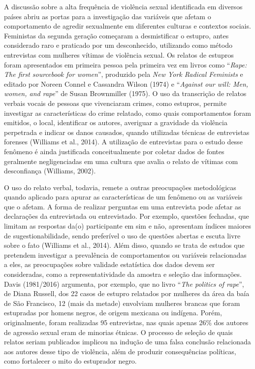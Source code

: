 A discussão sobre a alta frequência de violência sexual identificada em diversos países abriu as portas para a investigação das variáveis que afetam o comportamento de agredir sexualmente em diferentes culturas e contextos sociais. Feministas da segunda geração começaram a desmistificar o estupro, antes considerado raro e praticado por um desconhecido, utilizando como método entrevistas com mulheres vítimas de violência sexual. Os relatos de estupros foram apresentados em primeira pessoa pela primeira vez em livros como ``\textit{Rape: The first sourcebook for women}'', produzido pela \textit{New York Radical Feminists} e editado por Noreen Connel e Cassandra Wilson (1974) e ``\textit{Against our will: Men, women, and rape}'' de Susan Brownmiller (1975). O uso da transcrição de relatos verbais vocais de pessoas que vivenciaram crimes, como estupros, permite investigar as características do crime relatado, como quais comportamentos foram emitidos, o local, identificar os autores, averiguar a gravidade da violência perpetrada e indicar os danos causados, quando utilizadas técnicas de entrevistas forenses (Williams et al., 2014). A utilização de entrevistas para o estudo desse fenômeno é ainda justificada conceitualmente por coletar dados de fontes geralmente negligenciadas em uma cultura que avalia o relato de vítimas com desconfiança (Williams, 2002). 

O uso do relato verbal, todavia, remete a outras preocupações metodológicas quando aplicado para apurar as características de um fenômeno ou as variáveis que o afetam. A forma de realizar perguntas em uma entrevista pode afetar as declarações da entrevistada ou entrevistado. Por exemplo, questões fechadas, que limitam as respostas da(o) participante em sim e não, apresentam índices maiores de sugestionabilidade, sendo preferível o uso de questões abertas e escuta livre sobre o fato (Williams et al., 2014). Além disso, quando se trata de estudos que pretendem investigar a prevalência de comportamentos ou variáveis relacionadas a eles, as preocupações sobre validade estatística dos dados devem ser consideradas, como a representatividade da amostra e seleção das informações. Davis (1981/2016) argumenta, por exemplo, que no livro ``\textit{The politics of rape}'', de Diana Russell, dos 22 casos de estupro relatados por mulheres da área da baía de São Francisco, 12 (mais da metade) envolviam mulheres brancas que foram estupradas por homens negros, de origem mexicana ou indígena. Porém, originalmente, foram realizadas 95 entrevistas, nas quais apenas 26\% dos autores de agressão sexual eram de minorias étnicas. O processo de seleção de quais relatos seriam publicados implicou na indução de uma falsa conclusão relacionada aos autores desse tipo de violência, além de produzir consequências políticas, como fortalecer o mito do estuprador negro.

